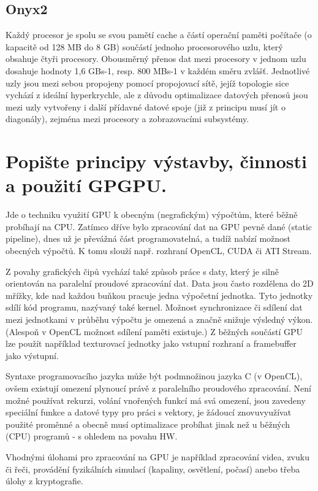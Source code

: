 	\subsection*{Onyx2}
		Každý procesor je spolu se svou pamětí cache a částí operační paměti počítače (o kapacitě od 128 MB do 8 GB) součástí jednoho procesorového uzlu, který obsahuje čtyři procesory. Obousměrný přenos dat mezi procesory v jednom uzlu dosahuje hodnoty 1,6 GBs-1, resp. 800 MBs-1 v každém směru zvlášť. Jednotlivé uzly jsou mezi sebou propojeny pomocí propojovací sítě, jejíž topologie sice vychází z ideální hyperkrychle, ale z důvodu optimalizace datových přenosů jsou mezi uzly vytvořeny i další přídavné datové spoje (již z principu musí jít o diagonály), zejména mezi procesory a zobrazovacími subsystémy.
	

\section{Popište principy výstavby, činnosti a použití GPGPU.}
	Jde o techniku využití GPU k obecným (negrafickým) výpočtům, které běžně probíhají na CPU. Zatímco dříve bylo zpracování dat na GPU pevně dané (static pipeline), dnes už je převážná část programovatelná, a tudíž nabízí možnost obecných výpočtů. K tomu slouží např. rozhraní OpenCL, CUDA či ATI Stream.
	
	Z povahy grafických čipů vychází také způsob práce s daty, který je silně orientován na paralelní proudové zpracování dat. Data jsou často rozdělena do 2D mřížky, kde nad každou buňkou pracuje jedna výpočetní jednotka. Tyto jednotky sdílí kód programu, nazývaný také kernel. Možnost synchronizace či sdílení dat mezi jednotkami v průběhu výpočtu je omezená a značně snižuje výsledný výkon. (Alespoň v OpenCL možnost sdílení paměti existuje.) Z běžných součástí GPU lze použít například texturovací jednotky jako vstupní rozhraní a framebuffer jako výstupní.
	
	Syntaxe programovacího jazyka může být podmnožinou jazyka C (v OpenCL), ovšem existují omezení plynoucí právě z paralelního proudového zpracování. Není možné používat rekurzi, volání vnořených funkcí má svá omezení, jsou zavedeny speciální funkce a datové typy pro práci s vektory, je žádoucí znovuvyužívat použité proměnné a obecně musí optimalizace probíhat jinak než u běžných (CPU) programů - s ohledem na povahu HW.
	
	Vhodnými úlohami pro zpracování na GPU je například zpracování videa, zvuku či řeči, provádění fyzikálních simulací (kapaliny, osvětlení, počasí) anebo třeba úlohy z kryptografie.


